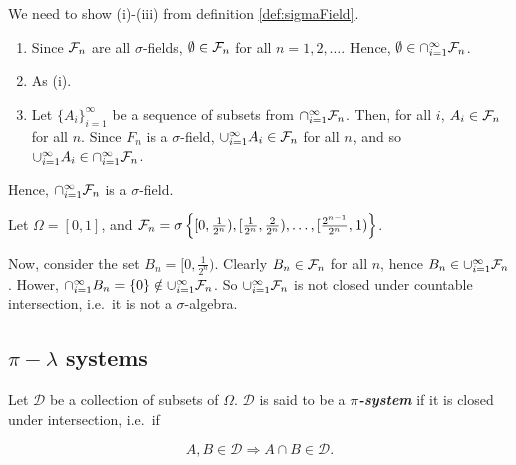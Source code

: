 \documentclass[]{book}
\providecommand{\tightlist}{%
  \setlength{\itemsep}{0pt}\setlength{\parskip}{0pt}}
\theoremstyle{definition}
\theoremstyle{definition}
\theoremstyle{definition}
\theoremstyle{remark}
\let\BeginKnitrBlock\begin \let\EndKnitrBlock\end
\begin{document}
\BeginKnitrBlock{solution}[\@ref(exr:ex11) a)]
\iffalse{} {Solution (\ref{exr:ex11} a)). } \fi{}We need to show
(i)-(iii) from definition \ref{def:sigmaField}.

\begin{enumerate}
\def\labelenumi{\roman{enumi})}
\tightlist
\item
  Since \(\mathcal{F}_n\) are all \(\sigma\)-fields, \(\emptyset \in \mathcal{F}_n\) for
  all \(n=1,2,\ldots\). Hence,
  \(\emptyset \in \cap_{i=1}^{\infty} \mathcal{F}_n\).
\item
  As (i).
\item
  Let \(\{A_i\}_{i=1}^\infty\) be a sequence of subsets from
  \(\cap_{i=1}^{\infty} \mathcal{F}_n\). Then, for all \(i\), \(A_i \in \mathcal{F}_n\)
  for all \(n\). Since \(F_n\) is a \(\sigma\)-field,
  \(\cup_{i=1}^\infty A_i \in \mathcal{F}_n\) for all \(n\), and so
  \(\cup_{i=1}^\infty A_i \in \cap_{i=1}^\infty \mathcal{F}_n\).
\end{enumerate}

Hence, \(\cap_{i=1}^\infty \mathcal{F}_n\) is a \(\sigma\)-field.
\EndKnitrBlock{solution}

\BeginKnitrBlock{solution}[\@ref(exr:ex11) b)]
\iffalse{} {Solution (\ref{exr:ex11} b)). } \fi{} Let
\(\Omega = [0,1]\), and
\(\mathcal{F}_n = \sigma \left\{[0,\tfrac{1}{2^n}),[\tfrac{1}{2^n},\tfrac{2}{2^n}), \ldots, [\tfrac{2^{n-1}}{2^n}, 1)\right\}\).

Now, consider the set \(B_n = [0, \tfrac{1}{2^n})\). Clearly
\(B_n \in \mathcal{F}_n\) for all \(n\), hence
\(B_n \in \cup_{i=1}^\infty \mathcal{F}_n\). Hower,
\(\cap_{i = 1}^{\infty} B_n = \{0\} \notin \cup_{i=1}^\infty \mathcal{F}_n\). So
\(\cup_{i=1}^\infty \mathcal{F}_n\) is not closed under countable intersection,
i.e.~it is not a \(\sigma\)-algebra.
\EndKnitrBlock{solution}

\subsection{\texorpdfstring{\(\pi-\lambda\)
systems}{\textbackslash{}pi-\textbackslash{}lambda systems}}\label{pi-lambda-systems}

\BeginKnitrBlock{definition}[$\pi$-system]
\protect\hypertarget{def:pi-system}{}{\label{def:pi-system}
\iffalse (\(\pi\)-system) \fi{} }Let \(\mathcal{D}\) be a collection of
subsets of \(\Omega\). \(\mathcal{D}\) is said to be a
\textbf{\emph{\(\pi\)-system}} if it is closed under intersection,
i.e.~if

\[
  A,B \in \mathcal{D} \Rightarrow A \cap B \in \mathcal{D}.
\]
\EndKnitrBlock{definition}
\end{document}

